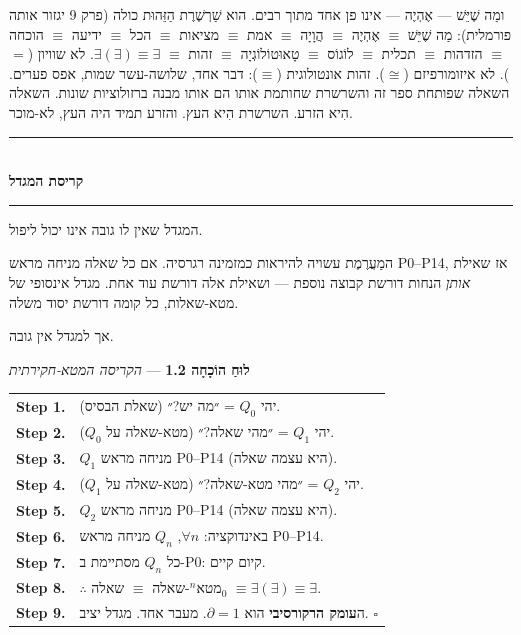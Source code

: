 \documentclass[10pt, openany, oneside]{book}
\renewcommand{\normalsize}{\fontsize{10}{13}\selectfont}
\begin{document}
ומַה שֶׁיֵּשׁ — אֶהְיֶה — אינו פן אחד מתוך רבים. הוא שַׁרְשֶׁרֶת הַזֵּהוּת כולה (פרק 9 יגזור אותה פורמלית): מַה שֶׁיֵּשׁ $\equiv$ אֶהְיֶה $\equiv$ הֲוָיָה $\equiv$ אמת $\equiv$ מציאות $\equiv$ הכל $\equiv$ ידיעה $\equiv$ הוכחה $\equiv$ הזדהות $\equiv$ תכלית $\equiv$ לוֹגוֹס $\equiv$ טָאוּטוֹלוֹגְיָה $\equiv$ זהות $\equiv$ $\exists(\exists) \equiv \exists$. לא שוויון ($=$). לא איזומורפיזם ($\cong$). זהות אונטולוגית ($\equiv$): דבר אחד, שלושה-עשר שמות, אפס פערים. השאלה שפותחת ספר זה והשרשרת שחותמת אותו הם אותו מבנה ברזולוציות שונות. השאלה הִיא הזרע. השרשרת הִיא העץ. והזרע תמיד היה העץ, לא-מוכר.

\vspace{1.5em}


\begin{center}
    \rule{0.3\textwidth}{0.4pt}\\[0.5em]
    {\normalsize\bfseries\textsc{קריסת המגדל}}\\[0.3em]
    \rule{0.3\textwidth}{0.4pt}
\end{center}

\vspace{1em}

\noindent המגדל שאין לו גובה אינו יכול ליפול.

המַעֲרֶמֶת עשויה להיראות כמזמינה רגרסיה. אם כל שאלה מניחה מראש P0–P14, אז שאילת \textit{אותן} הנחות דורשת קבוצה נוספת — ושאילת אלה דורשת עוד אחת. מגדל אינסופי של מטא-שאלות, כל קומה דורשת יסוד משלה.

אך למגדל אין גובה.

\textbf{לוּחַ הוֹכָחָה 1.2} --- \textit{הקריסה המטא-חקירתית}

\vspace{0.5em}

\noindent\begin{tabular}{r p{}}
\textbf{Step 1.} & יהי $Q_0$ = ״מה יש?״ (שאלת הבסיס). \\[0.3em]
\textbf{Step 2.} & יהי $Q_1$ = ״מהי שאלה?״ (מטא-שאלה על $Q_0$). \\[0.3em]
\textbf{Step 3.} & $Q_1$ מניחה מראש P0–P14 (היא עצמה שאלה). \\[0.3em]
\textbf{Step 4.} & יהי $Q_2$ = ״מהי מטא-שאלה?״ (מטא-שאלה על $Q_1$). \\[0.3em]
\textbf{Step 5.} & $Q_2$ מניחה מראש P0–P14 (היא עצמה שאלה). \\[0.3em]
\textbf{Step 6.} & באינדוקציה: $\forall n$, $Q_n$ מניחה מראש P0–P14. \\[0.3em]
\textbf{Step 7.} & כל $Q_n$ מסתיימת ב-P0: קיום קיים. \\[0.3em]
\textbf{Step 8.} & $\therefore$ מטא$^n$-שאלה $\equiv$ שאלה$_0$ $\equiv \exists(\exists) \equiv \exists$. \\[0.3em]
\textbf{Step 9.} & ה\textbf{עומק הרקורסיבי} הוא $\partial = 1$. מעבר אחד. מגדל יציב. $\square$ \\[0.3em]
\end{tabular}
\end{document}

